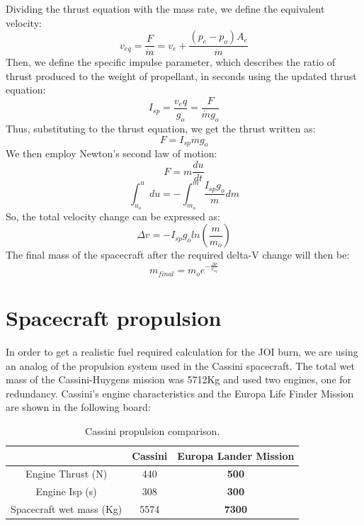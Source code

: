 \noindent
Dividing the thrust equation with the mass rate, we define the equivalent velocity:
\begin{equation}
v_{eq}=\frac{F}{\dot{m}}=v_e+\frac{(p_e-p_o) A_e}{\dot{m}}
\end{equation}
Then, we define the specific impulse parameter, which describes the ratio of thrust produced to the weight of propellant, in seconds using the updated thrust equation:
\begin{equation}
I_{sp}=\frac{v_eq}{g_o} =\frac{F}{\dot{m}g_o}
\end{equation}
Thus, substituting to the thrust equation, we get the thrust written as:
\begin{equation}
F=I_{sp}\dot{m}g_o
\end{equation}
We then employ Newton’s second law of motion:
\begin{equation}
F=m\frac{du}{dt}
\end{equation}
\begin{equation}
\int_{u_o}^{u}du=-\int_{m_o}^{m}\frac{I_{sp}g_o}{m}dm
\end{equation}
So, the total velocity change can be expressed as:
\begin{equation}
\Delta v=-I_{sp}g_o ln(\frac{m}{m_o})
\end{equation}
The final mass of the spacecraft after the required delta-V change will then be:
\begin{equation}
m_{final}=m_{o}e^{-\frac{\Delta v}{v_{eq}}}
\end{equation}
\section{Spacecraft propulsion}
In order to get a realistic fuel required calculation for the JOI burn, we are using an analog of the propulsion system used in the Cassini spacecraft. The total wet mass of the Cassini-Huygens mission was 5712Kg \cite{cassini} and used two engines, one for redundancy.
Cassini's engine characteristics and the Europa Life Finder Mission are shown in the following board:

\begin{table}[htb!]
  \centering
    \begin{tabular}{|c|c|c|}
    \hline
          & \textbf{Cassini} & \textbf{Europa Lander Mission} \bigstrut\\
    \hline
    Engine Thrust (N) & 440   & \textbf{500} \bigstrut\\
    \hline
    Engine Isp (s) & 308   & \textbf{300} \bigstrut\\
    \hline
    Spacecraft wet mass (Kg) & 5574  & \textbf{7300} \bigstrut\\
    \hline
    \end{tabular}%
    \caption{Cassini propulsion comparison.\cite{cassini}}
  \label{tab:propulsion}%
\end{table}%

